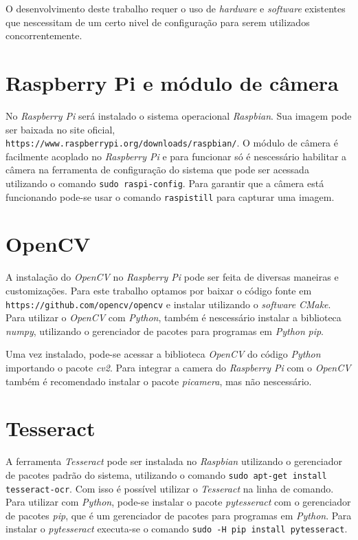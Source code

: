 O desenvolvimento deste trabalho requer o uso de \emph{hardware} e
\emph{software} existentes que nescessitam de um certo nivel de configuração
para serem utilizados concorrentemente.

\section{Raspberry Pi e módulo de câmera}
\label{sec:confrpi}

No \emph{Raspberry Pi} será instalado o sistema operacional \emph{Raspbian}. Sua
imagem pode ser baixada no site oficial,
\texttt{https://www.raspberrypi.org/downloads/raspbian/}. O módulo de câmera é
facilmente acoplado no \emph{Raspberry Pi} e para funcionar só é nescessário
habilitar a câmera na ferramenta de configuração do sistema que pode ser
acessada utilizando o comando \texttt{sudo raspi-config}. Para garantir que a
câmera está funcionando pode-se usar o comando \texttt{raspistill} para capturar
uma imagem.

\section{OpenCV}
\label{sec:confopencv}

A instalação do \emph{OpenCV} no \emph{Raspberry Pi} pode ser feita de diversas maneiras e customizações.
Para este trabalho optamos por baixar o código fonte em \texttt{https://github.com/opencv/opencv} e instalar
utilizando o \emph{software} \emph{CMake}. Para utilizar o \emph{OpenCV} com \emph{Python}, também é nescessário
instalar a biblioteca \emph{numpy}, utilizando o gerenciador de pacotes para programas em \emph{Python} \emph{pip}.

Uma vez instalado, pode-se acessar a biblioteca \emph{OpenCV} do código \emph{Python} importando o pacote \emph{cv2}.
Para integrar a camera do \emph{Raspberry Pi} com o \emph{OpenCV} também é recomendado instalar o pacote \emph{picamera},
mas não nescessário.

\section{Tesseract}
\label{sec:conftess}

A ferramenta \emph{Tesseract} pode ser instalada no \emph{Raspbian} utilizando o gerenciador de pacotes padrão do sistema,
utilizando o comando \texttt{sudo apt-get install tesseract-ocr}. Com isso é possível utilizar o \emph{Tesseract} na linha
de comando. Para utilizar com \emph{Python}, pode-se instalar o pacote \emph{pytesseract} com o gerenciador de pacotes \emph{pip},
que é um gerenciador de pacotes para programas em \emph{Python}. Para instalar o \emph{pytesseract} executa-se o comando
\texttt{sudo -H pip install pytesseract}.
